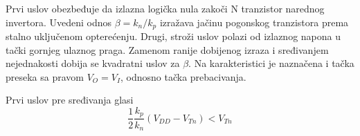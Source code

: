 Prvi uslov obezbeđuje da izlazna logička nula zakoči N tranzistor narednog invertora. Uvedeni odnos $\beta=k_n/k_p$ izražava jačinu pogonskog tranzistora prema stalno uključenom opterećenju. Drugi, stroži uslov polazi od izlaznog napona u tački gornjeg ulaznog praga. Zamenom ranije dobijenog izraza i sređivanjem nejednakosti dobija se kvadratni uslov za $\beta$. Na karakteristici je naznačena i tačka preseka sa pravom $V_O=V_I$, odnosno tačka prebacivanja.

Prvi uslov pre sređivanja glasi
\[\frac12\frac{k_p}{k_n}(V_{DD}-V_{Tn})<V_{Tn}\]
